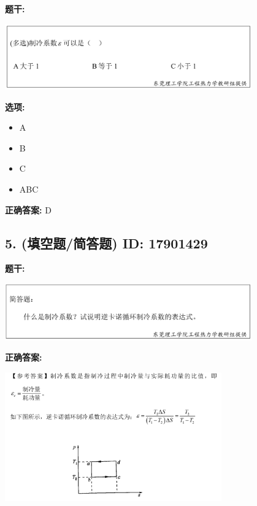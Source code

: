 \documentclass[12pt]{article}
\begin{document}
\textbf{题干:}


\begin{center}\includegraphics[width=0.8\textwidth, height=0.25\textheight, keepaspectratio]{question_4_17901439/title_img_1.png}\end{center}

\textbf{选项:}
\begin{itemize}[leftmargin=*]
  \item A

  \item B

  \item C

  \item ABC

\end{itemize}

\textbf{正确答案:}
D

\vspace{0.5em}\hrulefill\vspace{1em}

\subsection*{5. (填空题/简答题) \small ID: 17901429}

\textbf{题干:}


\begin{center}\includegraphics[width=0.8\textwidth, height=0.25\textheight, keepaspectratio]{question_5_17901429/title_img_1.png}\end{center}

\textbf{正确答案:}

\begin{center}\includegraphics[width=0.7\textwidth, height=0.2\textheight, keepaspectratio]{question_5_17901429/correct_answer_1_img_1.png}\end{center}
\end{document}
